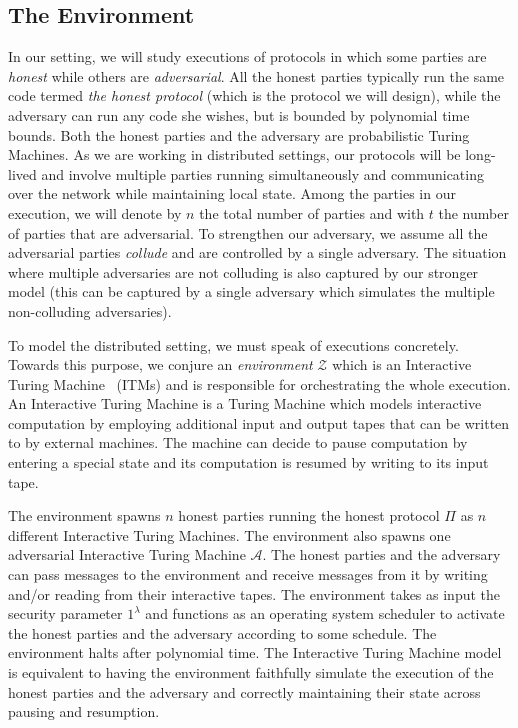 \subsection{The Environment}

In our setting, we will study executions of protocols in which some parties
are \emph{honest} while others are \emph{adversarial}. All the honest parties
typically run the same code termed \emph{the honest protocol} (which is the
protocol we will design), while the adversary can run any code she wishes, but
is bounded by polynomial time bounds. Both the honest parties and the adversary
are probabilistic Turing Machines. As we are working in distributed settings,
our protocols will be long-lived and involve multiple parties running
simultaneously and communicating over the network while maintaining local state.
Among the parties in our execution, we will denote by $n$ the total number of
parties and with $t$ the number of parties that are adversarial. To strengthen
our adversary, we assume all the adversarial parties \emph{collude} and are
controlled by a single adversary. The situation where multiple adversaries are
not colluding is also captured by our stronger model (this can be captured by a
single adversary which simulates the multiple non-colluding adversaries).

To model the distributed setting, we must speak of executions concretely.
Towards this purpose, we conjure an \emph{environment} $\mathcal{Z}$
 which is an
Interactive Turing Machine~\cite{interactive-tm} (ITMs)  and is responsible for
orchestrating the whole execution. An Interactive Turing Machine is a Turing
Machine which models interactive computation by employing additional input and
output tapes that can be written to by external machines. The machine can decide
to pause computation by entering a special state and its computation is resumed
by writing to its input tape.

The environment spawns $n$ honest parties running the honest protocol $\Pi$ as
$n$ different Interactive Turing Machines. The environment also spawns one
adversarial Interactive Turing Machine $\mathcal{A}$. The honest parties and the
adversary can pass messages to the environment and receive messages from it by
writing and/or reading from their interactive tapes. The environment takes as
input the security parameter $1^\lambda$ and functions as an operating system
scheduler to activate the honest parties and the adversary according to some
schedule. The environment halts after polynomial time. The Interactive Turing
Machine model is equivalent to having the environment faithfully simulate the
execution of the honest parties and the adversary and correctly maintaining
their state across pausing and resumption.

